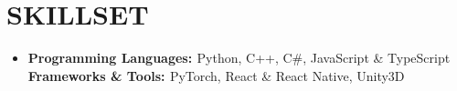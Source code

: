 \documentclass[letterpaper,11pt]{article}
\newcommand{\resumeItem}[1]{
  \item\small{
    {#1 \vspace{-2pt}}
  }
}
\newcommand{\resumeSubHeadingListStart}{\begin{itemize}[leftmargin=0.0in, label={}]}
\newcommand{\resumeSubHeadingListEnd}{\end{itemize}}
\newcommand{\resumeItemListStart}{\begin{itemize}}
\newcommand{\resumeItemListEnd}{\end{itemize}\vspace{-5pt}}
\begin{document}
%
\vspace{-5pt}
\section{SKILLSET}
\resumeSubHeadingListStart
\item {\textbf{\small{Programming Languages: }}Python, C++, C\#, JavaScript \& TypeScript} \\ {\textbf{\small{Frameworks \& Tools: }}PyTorch, React \& React Native, Unity3D}
\resumeSubHeadingListEnd
\end{document}
